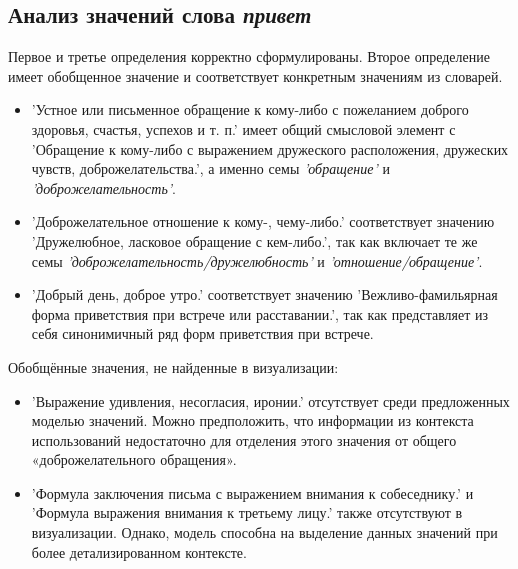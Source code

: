 \subsection*{Анализ значений слова \textit{привет}}

Первое и третье определения корректно сформулированы.
Второе определение имеет обобщенное значение и соответствует конкретным значениям из словарей.

\begin{itemize}
    \item ’Устное или письменное обращение к кому-либо с пожеланием доброго здоровья, счастья, успехов и т. п.’
имеет общий смысловой элемент с ’Обращение к кому-либо с выражением дружеского расположения,
дружеских чувств, доброжелательства.’, а именно семы \textit{’обращение’} и \textit{’доброжелательность’}.

    \item ’Доброжелательное отношение к кому-, чему-либо.’ соответствует значению
’Дружелюбное, ласковое обращение с кем-либо.’,
так как включает те же семы \textit{’доброжелательность/дружелюбность’} и \textit{’отношение/обращение’}.

    \item ’Добрый день, доброе утро.’ соответствует значению
’Вежливо-фамильярная форма приветствия при встрече или расставании.’,
так как представляет из себя синонимичный ряд форм приветствия при встрече.
\end{itemize}

Обобщённые значения, не найденные в визуализации:
\begin{itemize}
    \item ’Выражение удивления, несогласия, иронии.’ отсутствует среди предложенных моделью значений.
    Можно предположить, что информации из контекста использований недостаточно для отделения
    этого значения от общего «доброжелательного обращения».

    \item ’Формула заключения письма с выражением внимания к собеседнику.’ и ’Формула выражения внимания к третьему лицу.’ также отсутствуют в визуализации.
    Однако, модель способна на выделение данных значений при более детализированном контексте.

%
\end{itemize}


